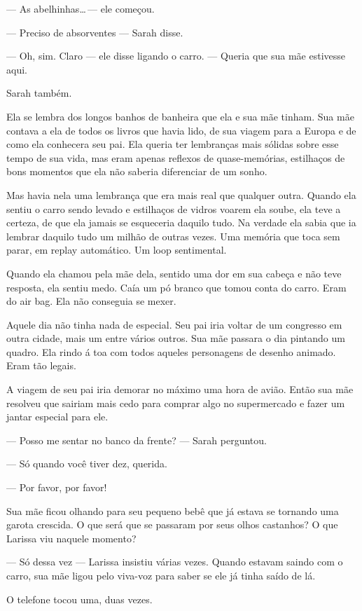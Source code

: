 --- As abelhinhas\ldots\,--- ele começou.

--- Preciso de absorventes --- Sarah disse.

--- Oh, sim. Claro --- ele disse ligando o carro. --- Queria que sua mãe estivesse aqui.

Sarah também.

Ela se lembra dos longos banhos de banheira que ela e sua mãe tinham. Sua mãe contava a ela de todos os livros que havia lido, de sua viagem para a Europa e de como ela conhecera seu pai. Ela queria ter lembranças mais sólidas sobre esse tempo de sua vida, mas eram apenas reflexos de quase-memórias, estilhaços de bons momentos que ela não saberia diferenciar de um sonho.

Mas havia nela uma lembrança que era mais real que qualquer outra. Quando ela sentiu o carro sendo levado e estilhaços de vidros voarem ela soube, ela teve a certeza, de que ela jamais se esqueceria daquilo tudo. Na verdade ela sabia que ia lembrar daquilo tudo um milhão de outras vezes. Uma memória que toca sem parar, em replay automático. Um loop sentimental.

Quando ela chamou pela mãe dela, sentido uma dor em sua cabeça e não teve resposta, ela sentiu medo. Caía um pó branco que tomou conta do carro. Eram do air bag. Ela não conseguia se mexer.

Aquele dia não tinha nada de especial. Seu pai iria voltar de um congresso em outra cidade, mais um entre vários outros. Sua mãe passara o dia pintando um quadro. Ela rindo á toa com todos aqueles personagens de desenho animado. Eram tão legais.

A viagem de seu pai iria demorar no máximo uma hora de avião. Então sua mãe resolveu que sairiam mais cedo para comprar algo no supermercado e fazer um jantar especial para ele.

--- Posso me sentar no banco da frente? --- Sarah perguntou.

--- Só quando você tiver dez, querida.

--- Por favor, por favor!

Sua mãe ficou olhando para seu pequeno bebê que já estava se tornando uma garota crescida. O que será que se passaram por seus olhos castanhos? O que Larissa viu naquele momento?

--- Só dessa vez --- Larissa insistiu várias vezes.
Quando estavam saindo com o carro, sua mãe ligou pelo viva-voz para saber se ele já tinha saído de lá.

O telefone tocou uma, duas vezes.

